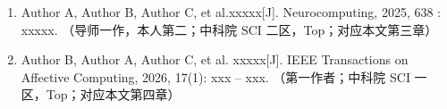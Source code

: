 
\personalresult

\begin{enumerate}
  \item  Author A, Author B, Author C, et al.\newblock xxxxx[J]. \newblock Neurocomputing, 2025, 638 : xxxxx. （导师一作，本人第二；中科院 SCI 二区，Top；对应本文第三章）
  \item Author B, Author A, Author C, et al. \newblock xxxxx[J].  \newblock IEEE Transactions on Affective Computing, 2026, 17(1): xxx – xxx. （第一作者；中科院 SCI 一区，Top；对应本文第四章）
\end{enumerate}

